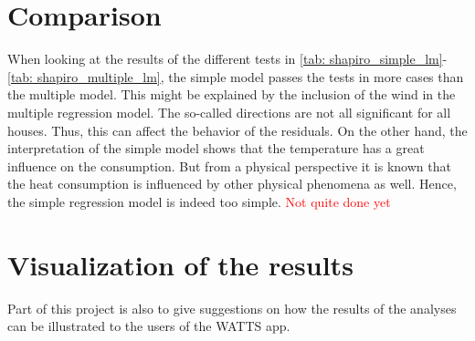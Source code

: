 \section{Comparison}
When looking at the results of the different tests in \cref{tab: shapiro_simple_lm}-\ref{tab: shapiro_multiple_lm}, the simple model passes the tests in more cases than the multiple model. This might be explained by the inclusion of the wind in the multiple regression model. The so-called directions are not all significant for all houses. Thus, this can affect the behavior of the residuals. On the other hand, the interpretation of the simple model shows that the temperature has a great influence on the consumption. But from a physical perspective it is known that the heat consumption is influenced by other physical phenomena as well. Hence, the simple regression model is indeed too simple. \textcolor{red}{Not quite done yet}

\section{Visualization of the results}
Part of this project is also to give suggestions on how the results of the analyses can be illustrated to the users of the WATTS app.

